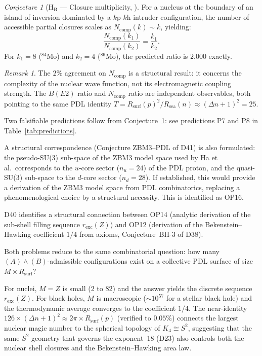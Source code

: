 \documentclass[11pt,a4paper]{article}
\theoremstyle{plain}
\theoremstyle{definition}
\theoremstyle{remark}
\newtheorem{remark}[theorem]{Remark}
\newtheorem{conjecture}[theorem]{Conjecture}
\newcommand{\Rsurf}{R_{\mathrm{surf}}}
\begin{document}
\begin{conjecture}[H$_\mathrm{B}$ — Closure multiplicity, \citep{D41}]
\label{conj:HB}
For a nucleus at the boundary of an island of inversion dominated by a $k$p-$k$h intruder configuration, the number of accessible partial closures scales as $N_{\mathrm{comp}}(k) \sim k$, yielding:
\[
\frac{N_{\mathrm{comp}}(k_1)}{N_{\mathrm{comp}}(k_2)} = \frac{k_1}{k_2}.
\]
For $k_1=8$ ($^{84}$Mo) and $k_2=4$ ($^{86}$Mo), the predicted ratio is $2.000$ exactly.
\end{conjecture}

\begin{remark}
The $2\%$ agreement on $N_{\mathrm{comp}}$ is a structural result: it concerns the complexity of the nuclear wave function, not its electromagnetic coupling strength.
The $B(E2)$ ratio and $N_{\mathrm{comp}}$ ratio are independent observables, both pointing to the same PDL identity $T = \Rsurf(p)^2/R_{\mathrm{sea}}(n) \approx (\Delta n+1)^2 = 25$.
\end{remark}

Two falsifiable predictions follow from Conjecture~\ref{conj:HB}: see predictions P7 and P8 in Table~\ref{tab:predictions}.

A structural correspondence (Conjecture ZBM3--PDL of D41) is also formulated: the pseudo-SU(3) sub-space of the ZBM3 model space used by Ha et al.\ corresponds to the $u$-core sector ($n_u=24$) of the PDL proton, and the quasi-SU(3) sub-space to the $d$-core sector ($n_d=28$).
If established, this would provide a derivation of the ZBM3 model space from PDL combinatorics, replacing a phenomenological choice by a structural necessity.
This is identified as OP16.

D40 identifies a structural connection between OP14 (analytic derivation of the sub-shell filling sequence $r_{\mathrm{exc}}(Z)$) and OP12 (derivation of the Bekenstein--Hawking coefficient $1/4$ from axioms, Conjecture~BH-3 of D38).

Both problems reduce to the same combinatorial question: how many $(A)\wedge(B)$-admissible configurations exist on a collective PDL surface of size $M \times \Rsurf$?

For nuclei, $M = Z$ is small (2 to 82) and the answer yields the discrete sequence $r_{\mathrm{exc}}(Z)$.
For black holes, $M$ is macroscopic ($\sim 10^{57}$ for a stellar black hole) and the thermodynamic average converges to the coefficient $1/4$.
The near-identity $126 \times (\Delta n+1)^2 \approx 2\pi \times \Rsurf(p)$ (verified to $0.05\%$) connects the largest nuclear magic number to the spherical topology of $K_4 \cong S^2$, suggesting that the same $S^2$ geometry that governs the exponent~18 (D23) also controls both the nuclear shell closures and the Bekenstein--Hawking area law.
\end{document}
